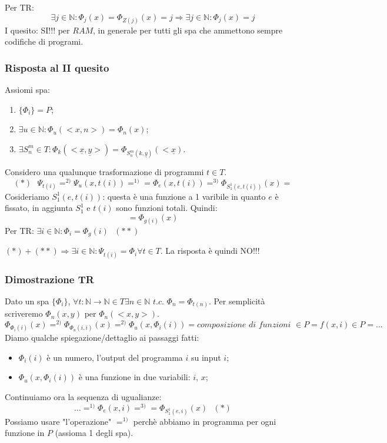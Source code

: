 \documentclass{article}
\begin{document}
Per TR:
\begin{displaymath}
	\exists j \in \mathbb{N}: \Phi_j(x)=\Phi_{Z(j)}(x)=j \Rightarrow \exists j \in \mathbb{N}:\Phi_j(x)=j
\end{displaymath}
I quesito: SI!!! per $RAM$, in generale per tutti gli spa che ammettono sempre codifiche di programi.

\subsubsection{Risposta al II quesito}
Assiomi spa:
\begin{enumerate}
	\item $\{ \Phi_i \}=P$;
	\item $\exists u \in \mathbb{N}: \Phi_u(<x,n>)=\Phi_n(x)$;
	\item $\exists  S_n^m \in T: \Phi_k(<\underline{x},\underline{y}>)=\Phi_{S_n^m(k,\underline{y})}(<\underline{x})$.
\end{enumerate}
Considero una qualunque trasformazione di programmi $t \in T$.
\begin{displaymath}
	(*) \textit{  } \Psi_{t(i)}=^{2)} \Psi_u(x,t(i))=^{1)}=\Phi_e(x,t(i))=^{3)} \Phi_{S_1^1(e,t(i))}(x)=
\end{displaymath}
Cosideriamo $S_1^1(e,t(i))$: questa è una funzione a 1 varibile in quanto $e$ è fissato, in aggiunta $S_1^1$ e $t(i)$ sono funzioni totali. Quindi:
\begin{displaymath}
	= \Phi_{g(i)}(x)
\end{displaymath}
Per TR: $\exists i \in \mathbb{N}: \Phi_i=\Phi_g(i) \textit{   } (**)$



$(*)+(**) \Rightarrow \exists i \in \mathbb{N}:\Psi_{t(i)}=\Phi_i \forall t \in T$.
La risposta è quindi NO!!!

\subsubsection{Dimostrazione TR}
Dato un spa $\{ \Phi_i \}$, $\forall t:\mathbb{N}\rightarrow \mathbb{N} \in T \exists n \in \mathbb{N} \textit{ t.c. } \Phi_n=\Phi_{t(n)}$. 
Per semplicità scriveremo $\Phi_n(x,y)$ per $\Phi_n(<x,y>)$.
\begin{displaymath}
	\Phi_{\Phi_i(i)}(x) =^{2)} \Phi_{\Phi_u(i,i)}(x) =^{2)} \Phi_u(x,\Phi_i(i))=\textit{composizione di funzioni $\in P$}=f(x,i) \in P = \dots
\end{displaymath}
Diamo qualche spiegazione/dettaglio ai passaggi fatti:
\begin{itemize}
	\item ${\Phi_i(i)}$ è un numero, l'output del programma $i$  su input $i$;
	\item $\Phi_u(x,\Phi_i(i))$ è una funzione in due variabili: $i$, $x$;
\end{itemize}
Continuiamo ora la sequenza di ugualianze:
\begin{displaymath}
	\dots =^{1)} \Phi_e(x,i)=^{3)}= \Phi_{S_1^1(e,i)}(x) \textit{   } (*)
\end{displaymath}
Possiamo usare "l'operazione" $=^{1)}$ perchè abbiamo in programma per ogni funzione in $P$ (assioma 1 degli spa).
\end{document}
